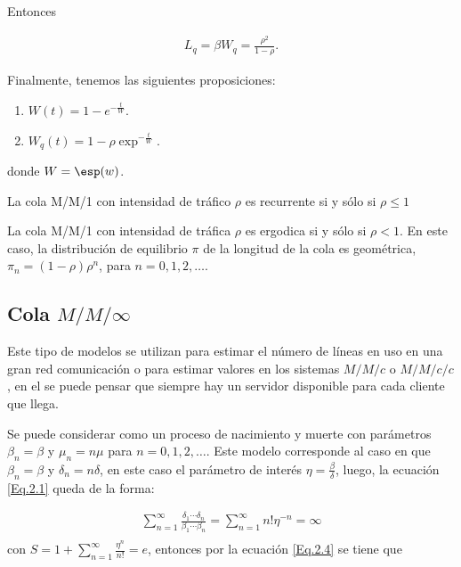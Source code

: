 Entonces

\begin{eqnarray*}
L_{q}=\beta W_{q}=\frac{\rho^{2}}{1-\rho}.
\end{eqnarray*}

Finalmente, tenemos las siguientes proposiciones:

\begin{Prop}
\begin{enumerate}
\item $W\left(t\right)=1-e^{-\frac{t}{W}}$.
\item $W_{q}\left(t\right)=1-\rho\exp^{-\frac{t}{W}}$.
\end{enumerate}
donde $W=\esp(w)$.
\end{Prop}

\begin{Prop}
La cola M/M/1 con intensidad de tr\'afico $\rho$ es recurrente si
y s\'olo si $\rho\leq1$
\end{Prop}

\begin{Prop}
La cola M/M/1 con intensidad de tr\'afica $\rho$ es ergodica si y
s\'olo si $\rho<1$. En este caso, la distribuci\'on de equilibrio
$\pi$ de la longitud de la cola es geom\'etrica,
$\pi_{n}=\left(1-\rho\right)\rho^{n}$, para $n=0,1,2,\ldots$.
\end{Prop}
%
\subsection{Cola $M/M/\infty$}
%

Este tipo de modelos se utilizan para estimar el n\'umero de l\'ineas en uso en una gran red comunicaci\'on o para estimar valores en los sistemas $M/M/c$ o $M/M/c/c$, en el se puede pensar que siempre hay un servidor disponible para cada cliente que llega.

Se puede considerar como un proceso de nacimiento y muerte con par\'ametros $\beta_{n}=\beta$ y $\mu_{n}=n\mu$ para $n=0,1,2,\ldots$. Este modelo corresponde al caso en que $\beta_{n}=\beta$ y $\delta_{n}=n\delta$, en este caso el par\'ametro de inter\'es $\eta=\frac{\beta}{\delta}$, luego, la ecuaci\'on \ref{Eq.2.1} queda de la forma:

\begin{eqnarray*}
\sum_{n=1}^{\infty}\frac{\delta_{1}\cdots\delta_{n}}{\beta_{1}\cdots\beta_{n}}=\sum_{n=1}^{\infty}n!\eta^{-n}=\infty\\
\end{eqnarray*}
con $S=1+\sum_{n=1}^{\infty}\frac{\eta^{n}}{n!}=e$, entonces por la ecuaci\'on \ref{Eq.2.4} se tiene que

